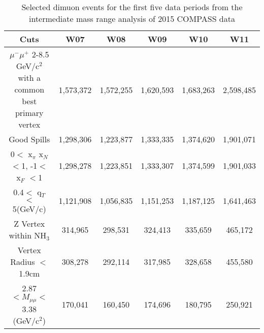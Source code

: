 \begin{table}[h!t]
  \begin{tabular}{ |c|c|c|c|c|c| }
    \hline \textbf{Cuts}& \textbf{W07}& \textbf{W08}& \textbf{W09}&
    \textbf{W10}& \textbf{W11} \\ \hline

    \multirow{3}{9em}{$\mu^-\mu^+$ 2-8.5 GeV/c$^2$ with a common best primary
      vertex}& & & & & \\
    & 1,573,372& 1,572,255& 1,620,593& 1,683,263& 2,598,485\\
    & & & & & \\ \hline
    
    Good Spills& 1,298,306& 1,223,877& 1,333,335& 1,374,620& 1,901,071
    \\ \hline
    
    0$<$ x$_{\pi}$ x$_N$ $<$1, -1$<$ x$_F$ $<$1& 1,298,278& 1,223,851&
    1,333,307& 1,374,599& 1,901,033 \\ \hline

    0.4$<$ q$_T$ $<$5(GeV/c)& 1,121,908& 1,056,835& 1,151,253& 1,187,125&
    1,641,463\\ \hline

    Z Vertex within NH$_3$& 314,965& 298,531& 324,413& 335,659& 465,172
    \\ \hline

    Vertex Radius $<$ 1.9cm& 308,278& 292,114& 317,985& 328,658& 455,580
    \\ \hline

    2.87$< M_{\mu\mu} <$3.38 (GeV/c$^2$)&
    170,041& 160,450& 174,696& 180,795& 250,921
    \\ \hline
    
  \end{tabular}
  \caption{Selected dimuon events for the first five data periods from the
    intermediate mass range analysis of 2015 COMPASS data}
  \label{tab::JPsiStats1}
\end{table}

